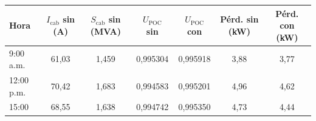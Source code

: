 \begin{tabular}{lcccccc}
\toprule
\textbf{Hora} & \textbf{$I_{\mathrm{cab}}$ sin (A)} & \textbf{$S_{\mathrm{cab}}$ sin (MVA)} & \textbf{$U_{\mathrm{POC}}$ sin} & \textbf{$U_{\mathrm{POC}}$ con} & \textbf{Pérd. sin (kW)} & \textbf{Pérd. con (kW)} \\
\midrule
9:00 a.m. & 61,03 & 1,459 & 0,995304 & 0,995918 & 3,88 & 3,77 \\
12:00 p.m. & 70,42 & 1,683 & 0,994583 & 0,995201 & 4,96 & 4,62 \\
15:00 & 68,55 & 1,638 & 0,994742 & 0,995350 & 4,73 & 4,44 \\
\bottomrule
\end{tabular}
